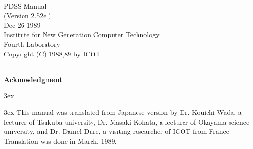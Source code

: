 \setlength{\oddsidemargin}{0mm}
\setlength{\evensidemargin}{0mm}
\setlength{\topmargin}{-20mm}
\setlength{\textheight}{250mm}
\setlength{\textwidth}{170mm}
\makeindex

\advance\oddsidemargin   -1mm
\advance\evensidemargin -11mm

\thispagestyle{empty}
\pagestyle{empty}
\begin{center}
\rule{0mm}{0mm}
\vspace*{60mm}\\
{\titlefont PDSS Manual}%
\vspace*{10mm}\\
{\LARGE (Version 2.52e )}
\vspace*{90mm}\\

{\Large Dec 26 1989}
\vspace*{10mm}\\
{\Large Institute for New Generation Computer Technology}
\vspace*{5mm}\\
{\Large Fourth Laboratory}
\vspace*{10mm}\\
{\large\sf
Copyright (C) 1988,89 by ICOT}
\end{center}

\newpage

\begin{center}
\rule{0mm}{0mm}
\vspace*{70mm}\\
{\LARGE\bf Acknowledgment}
\vspace*{10mm}\\
{\large\baselineskip3ex
\begin{minipage}{110mm}
\parindent3ex
This manual was translated from Japanese version by Dr. Kouichi Wada, a 
lecturer of Tsukuba university, Dr. Masaki Kohata, a lecturer of Okayama 
science university, and Dr. Daniel Dure, a visiting researcher of ICOT 
from France. Translation was done in March, 1989.
\end{minipage}}
\end{center}

\NewpageDouble

\tableofcontents

\NewpageDouble

\pagestyle{plain}
